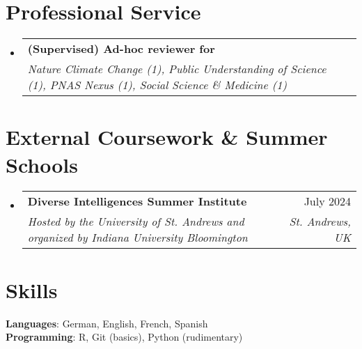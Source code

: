 \documentclass[letterpaper,11pt]{article}
\makeatletter
\newcommand{\resumeSubheading}[4]{
  \vspace{1pt}\item
    \begin{tabular*}{0.97\textwidth}[t]{l@{\extracolsep{\fill}}r}
      \textbf{#1} & #2 \\
      \textit{\small#3} & \textit{\small #4} \\
    \end{tabular*}\vspace{-7pt}
}
\newcommand{\resumeSubHeadingListStart}{\begin{itemize}[leftmargin=0.15in, label={}]}
\newcommand{\resumeSubHeadingListEnd}{\end{itemize}}
\makeatother
\begin{document}
\section{Professional Service}
  \resumeSubHeadingListStart

    \resumeSubheading
      {(Supervised) Ad-hoc reviewer for}{}
      {Nature Climate Change (1), Public Understanding of Science (1), PNAS Nexus (1), Social Science \& Medicine (1)
}{}

  \resumeSubHeadingListEnd

\section{External Coursework \& Summer Schools}
  \resumeSubHeadingListStart

    \resumeSubheading
      {Diverse Intelligences Summer Institute}{July 2024}
      {Hosted by the University of St. Andrews and organized by Indiana University Bloomington
}{St. Andrews, UK}

  \resumeSubHeadingListEnd

\section{Skills}
 \begin{itemize}[leftmargin=0.15in, label={}]
    \small{\item{
     \textbf{Languages}{: German, English, French, Spanish} \\
     \textbf{Programming}{: R, Git (basics), Python (rudimentary)} \\
    }}
 \end{itemize}

\end{document}
